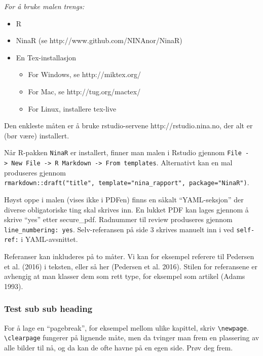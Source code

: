 \documentclass[11pt, a4paper]{article}
\providecommand{\tightlist}{%
  \setlength{\itemsep}{0pt}\setlength{\parskip}{0pt}}
\begin{document}
\emph{For å bruke malen trengs:}

\begin{itemize}
\tightlist
\item
  R
\item
  NinaR (se http://www.github.com/NINAnor/NinaR)
\item
  En Tex-installasjon

  \begin{itemize}
  \tightlist
  \item
    For Windows, se http://miktex.org/
  \item
    For Mac, se http://tug.org/mactex/
  \item
    For Linux, installere tex-live
  \end{itemize}
\end{itemize}

Den enkleste måten er å bruke rstudio-servene http://rstudio.nina.no,
der alt er (bør være) installert.

Når R-pakken \texttt{NinaR} er installert, finner man malen i Rstudio
gjennom
\texttt{File\ -\textgreater{}\ New\ File\ -\textgreater{}\ R\ Markdown\ -\textgreater{}\ From\ templates}.
Alternativt kan en mal produseres gjennom
\texttt{rmarkdown::draft("title",\ template="nina\_rapport",\ package="NinaR")}.

Høyst oppe i malen (vises ikke i PDFen) finns en såkalt ``YAML-seksjon''
der diverse obligatoriske ting skal skrives inn. En lukket PDF kan lages
gjennom å skrive ``yes'' etter secure\_pdf. Radnummer til review
produseres gjennom \texttt{line\_numbering:\ yes}. Selv-referansen på
side 3 skrives manuelt inn i ved \texttt{self-ref:} i YAML-avsnittet.

Referanser kan inkluderes på to måter. Vi kan for eksempel referere til
Pedersen et al. (2016) i teksten, eller så her (Pedersen et al. 2016).
Stilen for referansene er avhengig at man klasser dem som rett type, for
eksempel som artikel (Adams 1993).

\hypertarget{test-sub-sub-heading}{%
\subsubsection{Test sub sub heading}\label{test-sub-sub-heading}}

For å lage en ``pagebreak'', for eksempel mellom ulike kapittel, skriv
\texttt{\textbackslash{}newpage}. \texttt{\textbackslash{}clearpage}
fungerer på lignende måte, men da tvinger man frem en plassering av alle
bilder til nå, og da kan de ofte havne på en egen side. Prøv deg frem.
\end{document}
